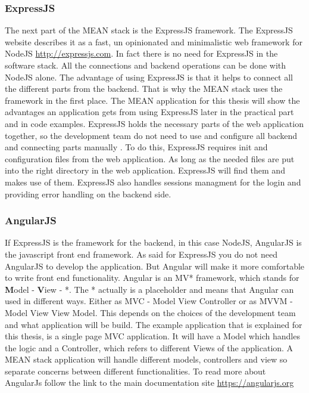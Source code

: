 \subsubsection{ExpressJS}
The next part of the MEAN stack is the ExpressJS framework. The ExpressJS website describes it as a fast, un opinionated and minimalistic web framework
for NodeJS \url{http://expressjs.com}. In fact there is no need for ExpressJS in the software stack. All the connections and backend operations can be done
with NodeJS alone. The advantage of using ExpressJS is that it helps to connect all the different parts from the backend. That is why the MEAN stack uses the
framework in the first place. The MEAN application for this thesis will show the advantages an application gets from using ExpressJS later in the practical part
and in code examples. ExpressJS holds the necessary parts of the web application together, so the development team do not need to use and configure all backend
and connecting parts manually \cite{brown2014web}. To do this, ExpressJS requires init and configuration files from the web application. As long as
the needed files are put into the right directory in the web application. ExpressJS will find them and makes use of them. ExpressJS also handles sessions managment
for the login and providing error handling on the backend side.

\subsubsection{AngularJS}
If ExpressJS is the framework for the backend, in this case NodeJS, AngularJS is the javascript front end framework. As said for ExpressJS you do not need
AngularJS to develop the application. But Angular will make it more comfortable to write front end functionality. Angular is an MV* framework, which stands
for \textbf{M}odel - \textbf{V}iew - *. The * actually is a placeholder and means that Angular can used in different ways. Either as MVC - Model View Controller
or as MVVM - Model View View Model. This depends on the choices of the development team and what application will be build. The example application that is
explained for this thesis, is a single page MVC application. It will have a Model which handles the logic and a Controller, which refers to different Views of
the application. A MEAN stack application will handle different models, controllers and view so separate concerns between different functionalities.
To read more about AngularJs follow the link to the main documentation site \url{https://angularjs.org}

